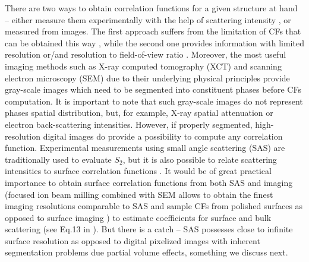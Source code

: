 \documentclass[reprint,amsmath,amssymb,aps,pre]{revtex4-1}
\begin{document}
There are two ways to obtain correlation functions for a given structure at hand
-- either measure them experimentally with the help of scattering intensity
\cite{Debye;Jiao_XCT}, or measured from images. The first approach suffers from
the limitation of CFs that can be obtained this way \cite{Gommes_notchord},
while the second one provides information with limited resolution or/and
resolution to field-of-view ratio \cite{SciRep}. Moreover, the most useful imaging
methods such as X-ray computed tomography (XCT) and scanning electron microscopy
(SEM) due to their underlying physical principles provide gray-scale images
which need to be segmented \cite{Schluter_review} into constituent phases before
CFs computation. It is important to note that such gray-scale images do not
represent phases spatial distribution, but, for example, X-ray spatial
attenuation or electron back-scattering intensities. However, if properly
segmented, high-resolution digital images do provide a possibility to compute
any correlation function. Experimental measurements using small angle scattering
(SAS) are traditionally used to evaluate $S_2$, but it is also possible to
relate scattering intensities to surface correlation functions
\cite{Ma_Torq+inthere}. It would be of great practical importance to obtain
surface correlation functions from both SAS and imaging (focused ion beam
milling combined with SEM allows to obtain the finest imaging resolutions
comparable to SAS and sample CFs from polished surfaces as opposed to surface
imaging \cite{FIB-SEM_paper}) to estimate coefficients for surface and bulk
scattering (see Eq.13 in \cite{Ma_Torq}). But there is a catch -- SAS possesses
close to infinite surface resolution as opposed to digital pixelized images with
inherent segmentation problems due partial volume effects, something we discuss
next.
\end{document}

